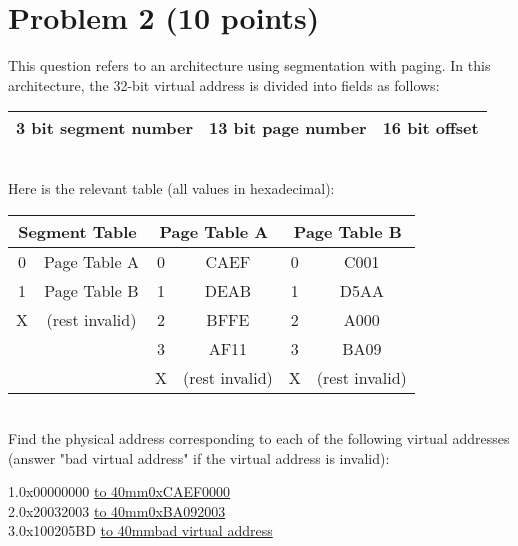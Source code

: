 \documentclass[answers]{exam}
\begin{document}
\section*{Problem 2 (10 points)}
This question refers to an architecture using segmentation with paging. In this architecture, the 32-bit virtual address is divided into fields as follows:
\begin{table}[h!]
  \begin{center}
    \begin{tabular}{|c|c|c|} 
      \hline
      3 bit segment number &	13 bit page number 	& 16 bit offset\\
      \hline
    \end{tabular}
  \end{center}
\end{table}
\\Here is the relevant table (all values in hexadecimal):
\begin{table}[h!]
  \begin{center}
    \begin{tabular}{|c|c|c|c|c|c|}
        \hline
        \multicolumn{2}{|c|}{Segment Table}& \multicolumn{2}{c|}{Page Table A}&\multicolumn{2}{c|}{Page Table B}\\
         \hline
        0&   Page Table A&  0&	CAEF&	0&	C001\\
         \hline
        1& 	 Page Table B&	1&	DEAB&	1&	D5AA\\
         \hline
        X&	(rest invalid)&	2&	BFFE&	2&	A000\\
         \hline
		&                 & 3&	AF11&	3&	BA09\\
		 \hline
	    &	              & X&	(rest invalid)&	X&	(rest invalid)\\
	     \hline
    \end{tabular}
  \end{center}
\end{table}
\\Find the physical address corresponding to each of the following virtual addresses (answer "bad virtual address" if the virtual address is invalid):\\
\begin{center}
1.0x00000000  \underline{\hbox to 40mm{0xCAEF0000}}\\
2.0x20032003  \underline{\hbox to 40mm{0xBA092003}}\\
3.0x100205BD  \underline{\hbox to 40mm{bad virtual address}}
\end{center}
\end{document}
